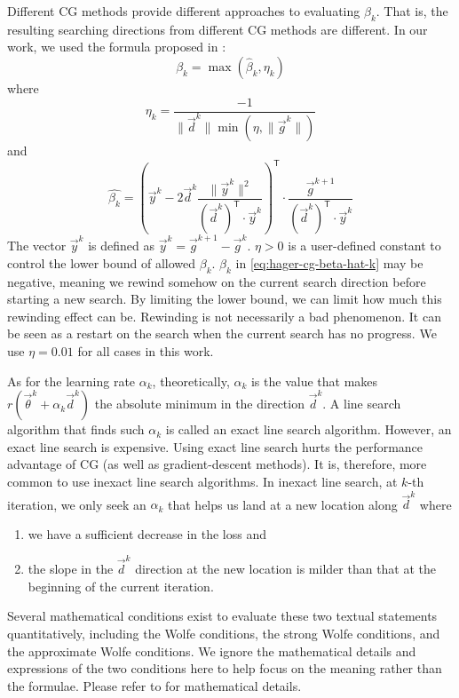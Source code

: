 Different CG methods provide different approaches to evaluating $\beta_k$.
That is, the resulting searching directions from different CG methods are different.
In our work, we used the formula proposed in \cite{hager_new_2005,hager_algorithm_2006}:
\begin{equation}\label{eq:hager-cg-beta}
    \beta_k = \max\left(\hat{\beta}_k, \eta_k\right)
\end{equation}
where
\begin{equation}\label{eq:hager-cg-etak}
    \eta_k = \frac{-1}{\lVert\vec{d}^k\rVert \min \left(\eta, \lVert\vec{g}^k\rVert\right)}
\end{equation}
and
\begin{equation}\label{eq:hager-cg-beta-hat-k}
    \hat{\beta_k} = \left(
        \vec{y}^k -
        2\vec{d}^k
        \frac{\lVert\vec{y}^k\rVert^2}{\left(\vec{d}^k\right)^\mathsf{T}\cdot \vec{y}^k}
    \right)^\mathsf{T}
    \cdot 
    \frac{\vec{g}^{k+1}}{\left(\vec{d}^k\right)^\mathsf{T}\cdot\vec{y}^k}
\end{equation}
The vector $\vec{y}^k$ is defined as $\vec{y}^k=\vec{g}^{k+1}-\vec{g}^k$.
$\eta > 0$ is a user-defined constant to control the lower bound of allowed $\beta_k$.
$\hat{\beta_k}$ in \eqref{eq:hager-cg-beta-hat-k} may be negative, meaning we rewind somehow on the current search direction before starting a new search.
By limiting the lower bound, we can limit how much this rewinding effect can be.
Rewinding is not necessarily a bad phenomenon.
It can be seen as a restart on the search when the current search has no progress.
We use $\eta=0.01$ for all cases in this work.

As for the learning rate $\alpha_k$, theoretically, $\alpha_k$ is the value that makes $r(\vec{\theta}^k+\alpha_k\vec{d}^k)$ the absolute minimum in the direction $\vec{d}^k$.
A line search algorithm that finds such $\alpha_k$ is called an exact line search algorithm.
However, an exact line search is expensive.
Using exact line search hurts the performance advantage of CG (as well as gradient-descent methods).
It is, therefore, more common to use inexact line search algorithms.
In inexact line search, at $k$-th iteration, we only seek an $\alpha_k$ that helps us land at a new location along $\vec{d}^k$ where
\begin{enumerate}[noitemsep,topsep=-12pt]
    \item we have a sufficient decrease in the loss and
    \item the slope in the $\vec{d}^k$ direction at the new location is milder than that at the beginning of the current iteration.
\end{enumerate}
Several mathematical conditions exist to evaluate these two textual statements quantitatively, including the Wolfe conditions, the strong Wolfe conditions, and the approximate Wolfe conditions.
We ignore the mathematical details and expressions of the two conditions here to help focus on the meaning rather than the formulae.
Please refer to \cite[Chapter~3]{nocedal_numerical_2006} for mathematical details.

